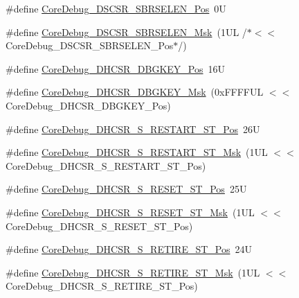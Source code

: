 \begin{DoxyCompactItemize}
\item 
\#define \mbox{\hyperlink{group___c_m_s_i_s___core_debug_ga3eb88e444b678057db1b59272eebb1ad}{Core\+Debug\+\_\+\+D\+S\+C\+S\+R\+\_\+\+S\+B\+R\+S\+E\+L\+E\+N\+\_\+\+Pos}}~0U
\item 
\#define \mbox{\hyperlink{group___c_m_s_i_s___core_debug_ga5e5ed94cac1139165af161c008881805}{Core\+Debug\+\_\+\+D\+S\+C\+S\+R\+\_\+\+S\+B\+R\+S\+E\+L\+E\+N\+\_\+\+Msk}}~(1\+U\+L /$\ast$$<$$<$ Core\+Debug\+\_\+\+D\+S\+C\+S\+R\+\_\+\+S\+B\+R\+S\+E\+L\+E\+N\+\_\+\+Pos$\ast$/)
\item 
\#define \mbox{\hyperlink{group___c_m_s_i_s___core_debug_gac91280edd0ce932665cf75a23d11d842}{Core\+Debug\+\_\+\+D\+H\+C\+S\+R\+\_\+\+D\+B\+G\+K\+E\+Y\+\_\+\+Pos}}~16U
\item 
\#define \mbox{\hyperlink{group___c_m_s_i_s___core_debug_ga1ce997cee15edaafe4aed77751816ffc}{Core\+Debug\+\_\+\+D\+H\+C\+S\+R\+\_\+\+D\+B\+G\+K\+E\+Y\+\_\+\+Msk}}~(0x\+F\+F\+F\+F\+U\+L $<$$<$ Core\+Debug\+\_\+\+D\+H\+C\+S\+R\+\_\+\+D\+B\+G\+K\+E\+Y\+\_\+\+Pos)
\item 
\#define \mbox{\hyperlink{group___c_m_s_i_s___core_debug_gaf6498d32dbe23b8d95a12d2fbc0a65f8}{Core\+Debug\+\_\+\+D\+H\+C\+S\+R\+\_\+\+S\+\_\+\+R\+E\+S\+T\+A\+R\+T\+\_\+\+S\+T\+\_\+\+Pos}}~26U
\item 
\#define \mbox{\hyperlink{group___c_m_s_i_s___core_debug_gabe3254d40aaa482987ff31584d2a3240}{Core\+Debug\+\_\+\+D\+H\+C\+S\+R\+\_\+\+S\+\_\+\+R\+E\+S\+T\+A\+R\+T\+\_\+\+S\+T\+\_\+\+Msk}}~(1\+U\+L $<$$<$ Core\+Debug\+\_\+\+D\+H\+C\+S\+R\+\_\+\+S\+\_\+\+R\+E\+S\+T\+A\+R\+T\+\_\+\+S\+T\+\_\+\+Pos)
\item 
\#define \mbox{\hyperlink{group___c_m_s_i_s___core_debug_ga6f934c5427ea057394268e541fa97753}{Core\+Debug\+\_\+\+D\+H\+C\+S\+R\+\_\+\+S\+\_\+\+R\+E\+S\+E\+T\+\_\+\+S\+T\+\_\+\+Pos}}~25U
\item 
\#define \mbox{\hyperlink{group___c_m_s_i_s___core_debug_gac474394bcceb31a8e09566c90b3f8922}{Core\+Debug\+\_\+\+D\+H\+C\+S\+R\+\_\+\+S\+\_\+\+R\+E\+S\+E\+T\+\_\+\+S\+T\+\_\+\+Msk}}~(1\+U\+L $<$$<$ Core\+Debug\+\_\+\+D\+H\+C\+S\+R\+\_\+\+S\+\_\+\+R\+E\+S\+E\+T\+\_\+\+S\+T\+\_\+\+Pos)
\item 
\#define \mbox{\hyperlink{group___c_m_s_i_s___core_debug_ga2328118f8b3574c871a53605eb17e730}{Core\+Debug\+\_\+\+D\+H\+C\+S\+R\+\_\+\+S\+\_\+\+R\+E\+T\+I\+R\+E\+\_\+\+S\+T\+\_\+\+Pos}}~24U
\item 
\#define \mbox{\hyperlink{group___c_m_s_i_s___core_debug_ga89dceb5325f6bcb36a0473d65fbfcfa6}{Core\+Debug\+\_\+\+D\+H\+C\+S\+R\+\_\+\+S\+\_\+\+R\+E\+T\+I\+R\+E\+\_\+\+S\+T\+\_\+\+Msk}}~(1\+U\+L $<$$<$ Core\+Debug\+\_\+\+D\+H\+C\+S\+R\+\_\+\+S\+\_\+\+R\+E\+T\+I\+R\+E\+\_\+\+S\+T\+\_\+\+Pos)

\end{DoxyCompactItemize}
